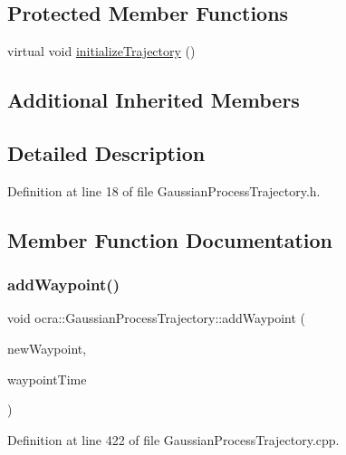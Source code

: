\subsection*{Protected Member Functions}
\begin{DoxyCompactItemize}
\item 
virtual void \hyperlink{classocra_1_1GaussianProcessTrajectory_aee26ead179583530615422b05c5e2081}{initialize\+Trajectory} ()
\end{DoxyCompactItemize}
\subsection*{Additional Inherited Members}


\subsection{Detailed Description}


Definition at line 18 of file Gaussian\+Process\+Trajectory.\+h.



\subsection{Member Function Documentation}
\hypertarget{classocra_1_1GaussianProcessTrajectory_af5b02e851e386e189b64038b429d37c6}{}\label{classocra_1_1GaussianProcessTrajectory_af5b02e851e386e189b64038b429d37c6} 
\subsubsection{\texorpdfstring{add\+Waypoint()}{addWaypoint()}\hspace{0.1cm}{\footnotesize\ttfamily [1/2]}}
{\footnotesize\ttfamily void ocra\+::\+Gaussian\+Process\+Trajectory\+::add\+Waypoint (\begin{DoxyParamCaption}\item[{const Eigen\+::\+Vector\+Xd}]{new\+Waypoint,  }\item[{const double}]{waypoint\+Time }\end{DoxyParamCaption})}



Definition at line 422 of file Gaussian\+Process\+Trajectory.\+cpp.

